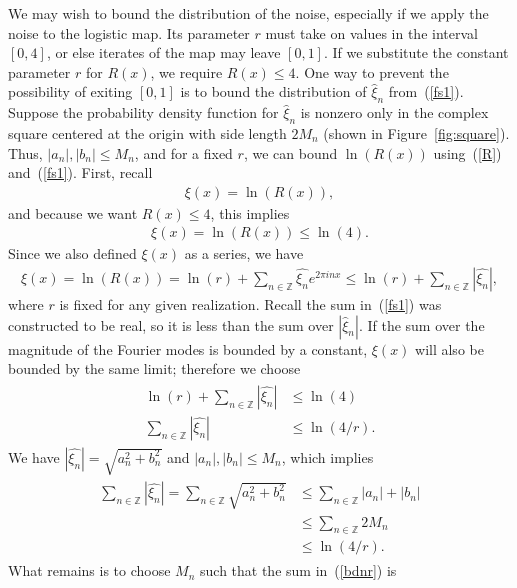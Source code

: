 We may wish to bound the distribution of the noise, especially if we
apply the noise to the logistic map. Its parameter $r$ must take on
values in the interval $[0,4]$, or else iterates of the map may leave $[0,1]$. If we
substitute the constant parameter $r$ for $R(x)$, we require
$R(x) \leq 4$. One way to prevent the possibility of exiting $[0,1]$ is to bound the distribution of $\hat{\xi}_n$ from~(\ref{fs1}). Suppose the probability density
function for $\hat{\xi}_n$ is nonzero only in the complex square centered at the
origin with side length $2M_n$ (shown in Figure~\ref{fig:square}). Thus, $|a_n|,|b_n| \leq M_n$, and for a fixed $r$, we
can bound $\ln(R(x))$ using~(\ref{R}) and~(\ref{fs1}). First, recall
\begin{align*}
\xi(x) = \ln(R(x)),
\end{align*}
and because we want $R(x) \leq 4$, this implies
\begin{align*}
\xi(x) = \ln(R(x)) \leq \ln(4).
\end{align*}
Since we also defined $\xi(x)$ as a series, we have
\begin{align*}
\xi(x) =\ln(R(x))= \ln(r) + \sum_{n \in \mathbb{Z}}\hat{\xi_n}e^{2\pi inx} \leq \ln(r) + \sum_{n \in \mathbb{Z}}|\hat{\xi_n}|,
\end{align*}
where $r$ is fixed for any given realization. Recall the sum
in~(\ref{fs1}) was constructed to be real, so it is less than the sum
over $|\hat{\xi}_n|$. If the sum over the magnitude of the Fourier modes is bounded by a constant, $\xi(x)$ will also be bounded by the same limit; therefore we choose
\begin{align*}
\begin{split}
\ln(r) + \sum_{n \in \mathbb{Z}}|\hat{\xi_n}| &\leq \ln(4)\\
\sum_{n \in \mathbb{Z}}|\hat{\xi_n}| &\leq \ln(4/r).
\end{split}
\end{align*}
We have $|\hat{\xi_n}| = \sqrt{a_n^2 + b_n^2}$ and $|a_n|,|b_n| \leq M_n$, which implies
\begin{align}
\begin{split}\label{bdnr}
\sum_{n \in \mathbb{Z}}|\hat{\xi_n}| =\sum_{n \in \mathbb{Z}}\sqrt{a_n^2 + b_n^2} &\leq \sum_{n \in
  \mathbb{Z}}|a_n| + |b_n|\\
&\leq \sum_{n \in \mathbb{Z}}2M_n\\
&\leq \ln(4/r).
\end{split}
\end{align}
What remains is to choose $M_n$ such that the sum in~(\ref{bdnr}) is
